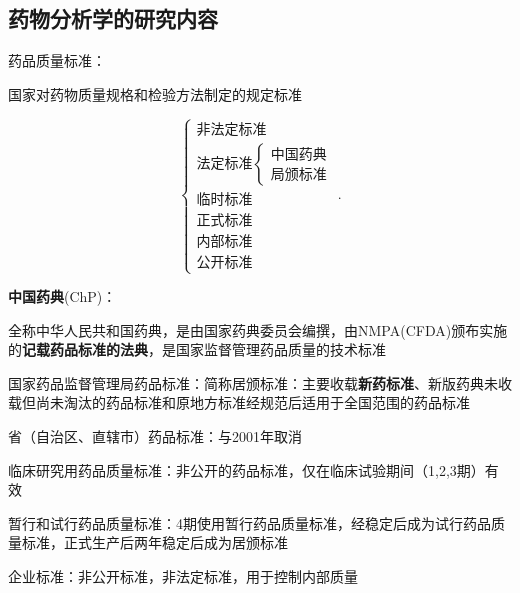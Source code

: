 \subsection{药物分析学的研究内容}%
\label{sub:药物分析学的研究内容}
\begin{notation}
    药品质量标准：

    国家对药物质量规格和检验方法制定的规定标准
\end{notation}
\[
    \begin{cases}
        \text{非法定标准}\\
        \text{法定标准}\begin{cases}
            \text{中国药典}\\
            \text{局颁标准}
        \end{cases}\\
        \text{临时标准}\\
        \text{正式标准}\\
        \text{内部标准}\\
        \text{公开标准}
    \end{cases}
.\] 
\begin{notation}
    \textbf{中国药典}(ChP)：

    全称中华人民共和国药典，是由国家药典委员会编撰，由NMPA(CFDA)颁布实施的\textbf{记载药品标准的法典}，是国家监督管理药品质量的技术标准
\end{notation}
\begin{notation}
    国家药品监督管理局药品标准：简称居颁标准：主要收载\textbf{新药标准}、新版药典未收载但尚未淘汰的药品标准和原地方标准经规范后适用于全国范围的药品标准
\end{notation}
省（自治区、直辖市）药品标准：与2001年取消
\begin{notation}
    临床研究用药品质量标准：非公开的药品标准，仅在临床试验期间（1,2,3期）有效

    暂行和试行药品质量标准：4期使用暂行药品质量标准，经稳定后成为试行药品质量标准，正式生产后两年稳定后成为居颁标准
\end{notation}
\begin{notation}
    企业标准：非公开标准，非法定标准，用于控制内部质量
\end{notation}
